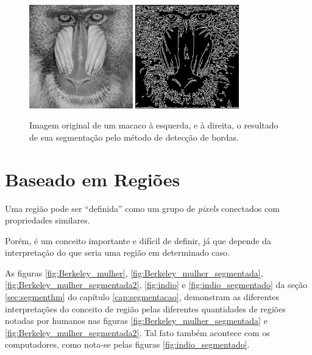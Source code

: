 \begin{figure}[!htb]
 \centering
 \def\baselinestretch{1}\small\normalsize
 \includegraphics[width=0.4\textwidth]{img/stf-smandrill.jpg}\qquad
 \includegraphics[width=0.4\textwidth]{img/stf-smandrill-edgedetect.jpg} 
 \caption{\label{fig:smandrill} Imagem original de um macaco à esquerda, e à direita, o resultado de sua segmentação pelo método de detecção de bordas. \citep{stanford}}
\end{figure}


\section{Baseado em Regiões}
Uma região pode ser “definida” como um grupo de \textit{pixels} conectados com propriedades similares.

Porém, é um conceito importante e difícil de definir, já que depende da interpretação do que seria uma região  em determinado caso.

As figuras \ref{fig:Berkeley_mulher}, \ref{fig:Berkeley_mulher_segmentada}, \ref{fig:Berkeley_mulher_segmentada2}, \ref{fig:indio} e \ref{fig:indio_segmentado} da seção \ref{sec:segmenthm} do capítulo \ref{cap:segmentacao}, demonstram as diferentes interpretações do conceito de região pelas diferentes quantidades de regiões notadas por humanos nas figuras \ref{fig:Berkeley_mulher_segmentada} e \ref{fig:Berkeley_mulher_segmentada2}. Tal fato também acontece com os computadores, como nota-se pelas figuras \ref{fig:indio_segmentado}.

